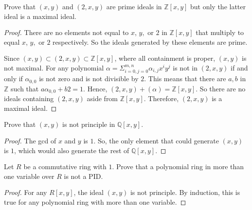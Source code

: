 \documentclass[10pt]{article}
\newenvironment{problem}[2][Problem]{\begin{trivlist}
		\item[\hskip \labelsep {\bfseries #1}\hskip \labelsep {\bfseries #2.}]}{\end{trivlist}}
\begin{document}
	\begin{problem}{1.5}
		Prove that $(x,y)$ and $(2,x,y)$ are prime ideals in $\mathbb{Z}[x,y]$ but only the latter ideal is a maximal ideal.
		\begin{proof}
			There are no elements not equal to $x$, $y,$ or $2$ in $\mathbb{Z}[x,y]$ that multiply to equal $x$, $y,$ or $2$ respectively. So the ideals generated by these elements are prime.
			
			Since $(x,y) \subset (2,x,y) \subset \mathbb{Z}[x,y]$, where all containment is proper, $(x,y)$ is not maximal. For any polynomial $\alpha = \Sigma_{i=0,j=0}^{m,n} \alpha_{i,j}x^iy^j$ is not in $(2,x,y)$ if and only if $\alpha_{0,0}$ is not zero and is not divisible by $2$. This means that there are $a,b$ in $\mathbb{Z}$ such that $a\alpha_{0,0} + b2 = 1$. Hence, $(2,x,y) + (\alpha) = \mathbb{Z}[x,y]$. So there are no ideals containing $(2,x,y)$ aside from $\mathbb{Z}[x,y]$. Therefore, $(2,x,y)$ is a maximal ideal.
		\end{proof}
	\end{problem}

	\begin{problem}{1.6}	
		Prove that $(x,y)$ is not principle in $\mathbb{Q}[x,y]$.
		\begin{proof}
			The gcd of $x$ and $y$ is $1$. So, the only element that could generate $(x,y)$ is $1$, which would also generate the rest of $\mathbb{Q}[x,y]$.
		\end{proof}
	\end{problem}
	
	\begin{problem}{1.7}
		Let $R$ be a commutative ring with $1$. Prove that a polynomial ring in more than one variable over $R$ is not a PID.
		\begin{proof}
			For any $R[x,y]$, the ideal $(x,y)$ is not principle. By induction, this is true for any polynomial ring with more than one variable.
		\end{proof}
	\end{problem}
\end{document}
